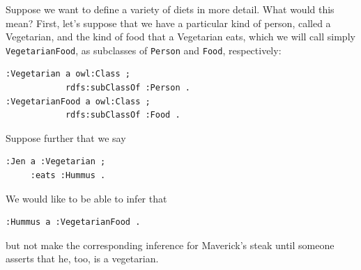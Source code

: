 Suppose we want to define a variety of diets in more detail. What would
this mean? First, let's suppose that we have a particular kind of
person, called a Vegetarian, and the kind of food that a Vegetarian
eats, which we will call simply \texttt{VegetarianFood}, as subclasses of \texttt{Person}
and \texttt{Food}, respectively:

\begin{lstlisting}
:Vegetarian a owl:Class ;
            rdfs:subClassOf :Person .
:VegetarianFood a owl:Class ;
            rdfs:subClassOf :Food .
\end{lstlisting}

Suppose further that we say

\begin{lstlisting}
:Jen a :Vegetarian ;
     :eats :Hummus .
\end{lstlisting}

We would like to be able to infer that

\begin{lstlisting}
:Hummus a :VegetarianFood .
\end{lstlisting}

but not make the corresponding inference for Maverick's steak until
someone asserts that he, too, is a vegetarian.

